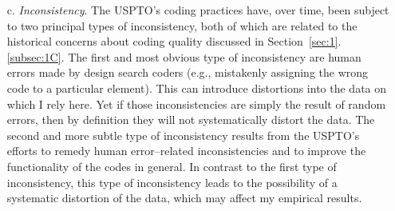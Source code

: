 \documentclass[letterpaper, 11pt, oneside]{article}
\begin{document}
\begin{enumerate}
For example, the marks shown below each have only one design search code, the design search code for cars (18.05.01), even though the mark on the left contains much more visual detail (e.g., more lines) than the mark on the right.

\begin{figure}[H]
\centering
\begin{subfigure}[h]{0.3\linewidth}
\texttt{[image: RN\_5456370\_drawing]} \
\caption{Drawing submitted for Registration No. 5,456,370}
\end{subfigure}
\hspace{30pt}
\begin{subfigure}[h]{0.4\linewidth}
\texttt{[image: RN\_3625662\_drawing]} \
\caption{Drawing submitted for Registration No. 3,625,662}
\end{subfigure}
\end{figure}
\par

\noindent And, perversely, both of these marks have fewer design search codes than the mark \texttt{[image: RN\_7139454\_drawing]},\footnote{Registration No. 7139454.} which is coded with the design search code for a circle (26.01.21) in addition to the code for cars.

\item[c.] \textit{Inconsistency}. The USPTO's coding practices have, over time, been subject to two principal types of inconsistency, both of which are related to the historical concerns about coding quality discussed in Section~\ref{sec:1}.\ref{subsec:1C}. The first and most obvious type of inconsistency are human errors made by design search coders (e.g., mistakenly assigning the wrong code to a particular element). This can introduce distortions into the data on which I rely here. Yet if those inconsistencies are simply the result of random errors, then by definition they will not systematically distort the data. The second and more subtle type of inconsistency results from the USPTO's efforts to remedy human error–related inconsistencies and to improve the functionality of the codes in general. In contrast to the first type of inconsistency, this type of inconsistency leads to the possibility of a systematic distortion of the data, which may affect my empirical results.


\end{enumerate}
\end{document}
